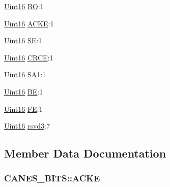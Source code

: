 \begin{DoxyCompactItemize}
\item 
\hyperlink{_d_s_p2833x___device_8h_a59a9f6be4562c327cbfb4f7e8e18f08b}{Uint16} \hyperlink{struct_c_a_n_e_s___b_i_t_s_ad30665ab6e2a0249d307eb5c891fc5a8}{B\+O}\+:1
\item 
\hyperlink{_d_s_p2833x___device_8h_a59a9f6be4562c327cbfb4f7e8e18f08b}{Uint16} \hyperlink{struct_c_a_n_e_s___b_i_t_s_a0e736aad641e00400cb10049cd2ec3bc}{A\+C\+K\+E}\+:1
\item 
\hyperlink{_d_s_p2833x___device_8h_a59a9f6be4562c327cbfb4f7e8e18f08b}{Uint16} \hyperlink{struct_c_a_n_e_s___b_i_t_s_a0fab3ea228dc7cb621c57defc4ce7a46}{S\+E}\+:1
\item 
\hyperlink{_d_s_p2833x___device_8h_a59a9f6be4562c327cbfb4f7e8e18f08b}{Uint16} \hyperlink{struct_c_a_n_e_s___b_i_t_s_afd5c348dd954f5cd1654eca33e08aaf0}{C\+R\+C\+E}\+:1
\item 
\hyperlink{_d_s_p2833x___device_8h_a59a9f6be4562c327cbfb4f7e8e18f08b}{Uint16} \hyperlink{struct_c_a_n_e_s___b_i_t_s_a02e11135c14062d8bdc7eb245af4c37d}{S\+A1}\+:1
\item 
\hyperlink{_d_s_p2833x___device_8h_a59a9f6be4562c327cbfb4f7e8e18f08b}{Uint16} \hyperlink{struct_c_a_n_e_s___b_i_t_s_a3fafd276b5cdb116751ef1241e4417a7}{B\+E}\+:1
\item 
\hyperlink{_d_s_p2833x___device_8h_a59a9f6be4562c327cbfb4f7e8e18f08b}{Uint16} \hyperlink{struct_c_a_n_e_s___b_i_t_s_a56b616520ba65ca407e3fd035d706d45}{F\+E}\+:1
\item 
\hyperlink{_d_s_p2833x___device_8h_a59a9f6be4562c327cbfb4f7e8e18f08b}{Uint16} \hyperlink{struct_c_a_n_e_s___b_i_t_s_abc3b29903f35895ca79edc4fb08315d6}{rsvd3}\+:7
\end{DoxyCompactItemize}


\subsection{Member Data Documentation}
\hypertarget{struct_c_a_n_e_s___b_i_t_s_a0e736aad641e00400cb10049cd2ec3bc}{}
\subsubsection[{A\+C\+K\+E}]{ C\+A\+N\+E\+S\+\_\+\+B\+I\+T\+S\+::\+A\+C\+K\+E}\label{struct_c_a_n_e_s___b_i_t_s_a0e736aad641e00400cb10049cd2ec3bc}
\hypertarget{struct_c_a_n_e_s___b_i_t_s_a3fafd276b5cdb116751ef1241e4417a7}{}
